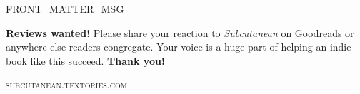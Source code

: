 \thispagestyle{empty}

\vspace*{10\nbs}

\begin{adjustwidth}{4em}{4em}
\begin{parascale}[0.88]
FRONT_MATTER_MSG

\end{parascale}
\end{adjustwidth}

\vspace*{4\nbs}

\begin{center}
\textbf{Reviews wanted!} Please share your reaction to \emph{Subcutanean} on Goodreads or anywhere else readers congregate. Your voice is a huge part of helping an indie book like this succeed. \textbf{Thank you!}

\vspace*{2\nbs}

\textsc{subcutanean.textories.com}
\end{center}

\cleartorecto


